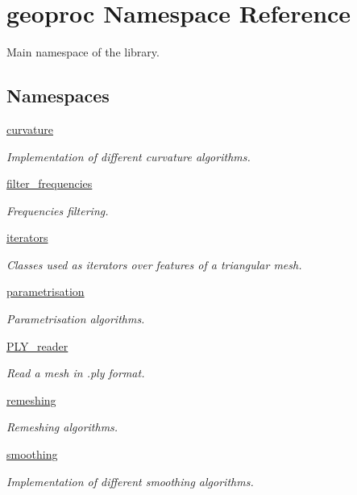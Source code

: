 \hypertarget{namespacegeoproc}{}\section{geoproc Namespace Reference}
\label{namespacegeoproc}


Main namespace of the library.  


\subsection*{Namespaces}
\begin{DoxyCompactItemize}
\item 
 \hyperlink{namespacegeoproc_1_1curvature}{curvature}
\begin{DoxyCompactList}\small\item\em Implementation of different curvature algorithms. \end{DoxyCompactList}\item 
 \hyperlink{namespacegeoproc_1_1filter__frequencies}{filter\+\_\+frequencies}
\begin{DoxyCompactList}\small\item\em Frequencies filtering. \end{DoxyCompactList}\item 
 \hyperlink{namespacegeoproc_1_1iterators}{iterators}
\begin{DoxyCompactList}\small\item\em Classes used as iterators over features of a triangular mesh. \end{DoxyCompactList}\item 
 \hyperlink{namespacegeoproc_1_1parametrisation}{parametrisation}
\begin{DoxyCompactList}\small\item\em Parametrisation algorithms. \end{DoxyCompactList}\item 
 \hyperlink{namespacegeoproc_1_1PLY__reader}{P\+L\+Y\+\_\+reader}
\begin{DoxyCompactList}\small\item\em Read a mesh in .ply format. \end{DoxyCompactList}\item 
 \hyperlink{namespacegeoproc_1_1remeshing}{remeshing}
\begin{DoxyCompactList}\small\item\em Remeshing algorithms. \end{DoxyCompactList}\item 
 \hyperlink{namespacegeoproc_1_1smoothing}{smoothing}
\begin{DoxyCompactList}\small\item\em Implementation of different smoothing algorithms. \end{DoxyCompactList}\end{DoxyCompactItemize}
